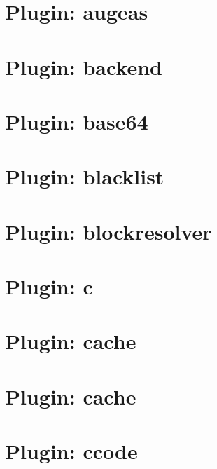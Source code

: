 \let\mypdfximage\pdfximage\def\pdfximage{\immediate\mypdfximage}\documentclass[twoside]{book}
\newcommand{\+}{\discretionary{\mbox{\scriptsize$\hookleftarrow$}}{}{}}
\begin{document}
\chapter{Plugin\+: augeas}
\label{md_src_plugins_augeas_README}

\chapter{Plugin\+: backend}
\label{md_src_plugins_backend_README}

\chapter{Plugin\+: base64}
\label{md_src_plugins_base64_README}

\chapter{Plugin\+: blacklist}
\label{md_src_plugins_blacklist_README}

\chapter{Plugin\+: blockresolver}
\label{md_src_plugins_blockresolver_README}

\chapter{Plugin\+: c}
\label{md_src_plugins_c_README}

\chapter{Plugin\+: cache}
\label{md_src_plugins_cache_README}

\chapter{Plugin\+: cache}
\label{md_src_plugins_cache_shelltests}

\chapter{Plugin\+: ccode}
\label{md_src_plugins_ccode_README}

\end{document}
